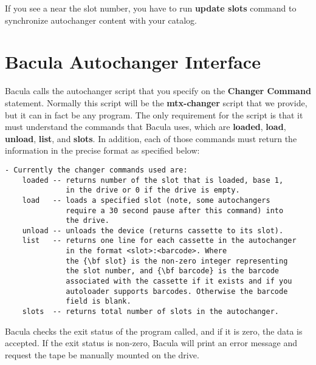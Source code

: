 If you see a {\bf *} near the slot number, you have to run {\bf update slots}
command to synchronize autochanger content with your catalog.

\label{interface}

\section{Bacula Autochanger Interface}

Bacula calls the autochanger script that you specify on the {\bf Changer
Command} statement. Normally this script will be the {\bf mtx-changer} script
that we provide, but it can in fact be any program. The only requirement
for the script is that it must understand the commands that
Bacula uses, which are {\bf loaded}, {\bf load}, {\bf
unload}, {\bf list}, and {\bf slots}. In addition,
each of those commands must return the information in the precise format as
specified below: 

\footnotesize
\begin{verbatim}
- Currently the changer commands used are:
    loaded -- returns number of the slot that is loaded, base 1,
              in the drive or 0 if the drive is empty.
    load   -- loads a specified slot (note, some autochangers
              require a 30 second pause after this command) into
              the drive.
    unload -- unloads the device (returns cassette to its slot).
    list   -- returns one line for each cassette in the autochanger
              in the format <slot>:<barcode>. Where
              the {\bf slot} is the non-zero integer representing
              the slot number, and {\bf barcode} is the barcode
              associated with the cassette if it exists and if you
              autoloader supports barcodes. Otherwise the barcode
              field is blank.
    slots  -- returns total number of slots in the autochanger.
\end{verbatim}
\normalsize

Bacula checks the exit status of the program called, and if it is zero, the
data is accepted. If the exit status is non-zero, Bacula will print an
error message and request the tape be manually mounted on the drive.
